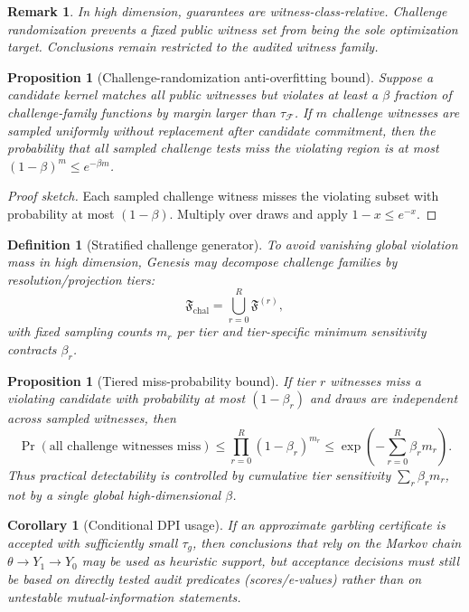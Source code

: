 \documentclass[11pt,a4paper]{article}
\newtheorem{proposition}[theorem]{Proposition}
\newtheorem{corollary}[theorem]{Corollary}
\newtheorem{definition}{Definition}[section]
\newtheorem{remark}{Remark}[section]
\begin{document}
\begin{remark}
In high dimension, guarantees are witness-class-relative.
Challenge randomization prevents a fixed public witness set from being the sole optimization target.
Conclusions remain restricted to the audited witness family.
\end{remark}

\begin{proposition}[Challenge-randomization anti-overfitting bound]
Suppose a candidate kernel matches all public witnesses but violates at least a $\beta$ fraction of challenge-family functions by margin larger than $\tau_{\mathcal{F}}$.
If $m$ challenge witnesses are sampled uniformly without replacement after candidate commitment, then the probability that all sampled challenge tests miss the violating region is at most $(1-\beta)^m\le e^{-\beta m}$.
\end{proposition}
\begin{proof}[Proof sketch]
Each sampled challenge witness misses the violating subset with probability at most $(1-\beta)$.
Multiply over draws and apply $1-x\le e^{-x}$.
\end{proof}

\begin{definition}[Stratified challenge generator]
To avoid vanishing global violation mass in high dimension, Genesis may decompose challenge families by resolution/projection tiers:
\[
\mathfrak{F}_{\mathrm{chal}}=\bigcup_{r=0}^{R}\mathfrak{F}^{(r)},
\]
with fixed sampling counts $m_r$ per tier and tier-specific minimum sensitivity contracts $\beta_r$.
\end{definition}

\begin{proposition}[Tiered miss-probability bound]
If tier $r$ witnesses miss a violating candidate with probability at most $(1-\beta_r)$ and draws are independent across sampled witnesses, then
\[
\Pr(\text{all challenge witnesses miss})\le \prod_{r=0}^{R}(1-\beta_r)^{m_r}
\le
\exp\!\left(-\sum_{r=0}^{R}\beta_r m_r\right).
\]
Thus practical detectability is controlled by cumulative tier sensitivity $\sum_r \beta_r m_r$, not by a single global high-dimensional $\beta$.
\end{proposition}

\begin{corollary}[Conditional DPI usage]
If an approximate garbling certificate is accepted with sufficiently small $\tau_g$, then conclusions that rely on the Markov chain $\theta\to Y_1\to Y_0$ may be used as \emph{heuristic support}, but acceptance decisions must still be based on directly tested audit predicates (scores/e-values) rather than on untestable mutual-information statements.
\end{corollary}
\end{document}
